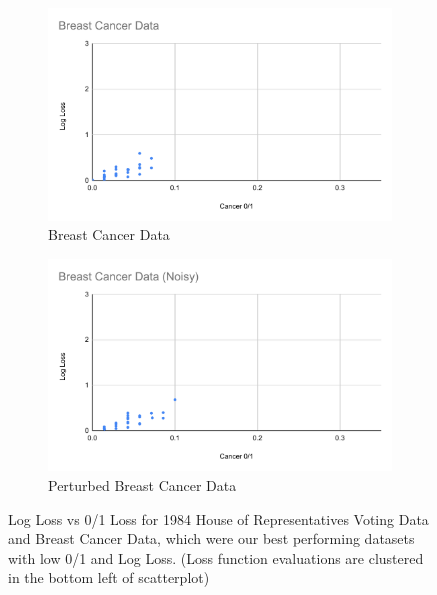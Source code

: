 \documentclass[twoside,11pt]{article}
\begin{document}
\begin{figure}[h!]
   \begin{subfigure}[b]{0.45\linewidth}
    \includegraphics[width=\linewidth]{images/BC.pdf}
    \caption{Breast Cancer Data}
  \end{subfigure}
  \begin{subfigure}[b]{0.45\linewidth}
    \includegraphics[width=\linewidth]{images/BC(noise).pdf}
    \caption{Perturbed Breast Cancer Data}
  \end{subfigure}
  \caption{Log Loss vs 0/1 Loss for 1984 House of Representatives Voting Data and Breast Cancer Data, which were our best performing datasets with low 0/1 and Log Loss. (Loss function evaluations are clustered in the bottom left of scatterplot)}
  \label{fig:good}
\end{figure}
  
\end{document}
